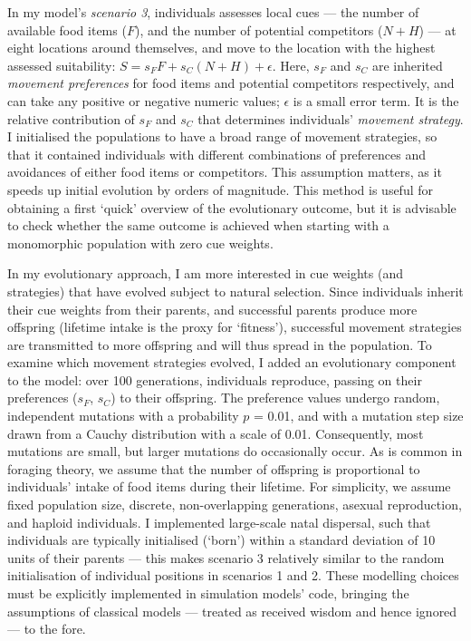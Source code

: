 \begin{interludeenv}
In my model's \textit{scenario 3}, individuals assesses local cues --- the number of available food items ($F$), and the number of potential competitors ($N + H$) --- at eight locations around themselves, and move to the location with the highest assessed suitability: $S = s_FF + s_C(N + H) + \epsilon$.
Here, $s_F$ and $s_C$ are inherited \textit{movement preferences} for food items and potential competitors respectively, and can take any positive or negative numeric values; $\epsilon$ is a small error term.
It is the relative contribution of $s_F$ and $s_C$ that determines individuals' \textit{movement strategy}.
I initialised the populations to have a broad range of movement strategies, so that it contained individuals with different combinations of preferences and avoidances of either food items or competitors.
This assumption matters, as it speeds up initial evolution by orders of magnitude. 
This method is useful for obtaining a first `quick' overview of the evolutionary outcome, but it is advisable to check whether the same outcome is achieved when starting with a monomorphic population with zero cue weights.

In my evolutionary approach, I am more interested in cue weights (and strategies) that have evolved subject to natural selection.
Since individuals inherit their cue weights from their parents, and successful parents produce more offspring (lifetime intake is the proxy for `fitness'), successful movement strategies are transmitted to more offspring and will thus spread in the population.
To examine which movement strategies evolved, I added an evolutionary component to the model: over 100 generations, individuals reproduce, passing on their preferences ($s_F$, $s_C$) to their offspring.
The preference values undergo random, independent mutations with a probability $p$ = 0.01, and with a mutation step size drawn from a Cauchy distribution with a scale of 0.01.
Consequently, most mutations are small, but larger mutations do occasionally occur.
As is common in foraging theory, we assume that the number of offspring is proportional to individuals' intake of food items during their lifetime.
For simplicity, we assume fixed population size, discrete, non-overlapping generations, asexual reproduction, and haploid individuals.
I implemented large-scale natal dispersal, such that individuals are typically initialised (`born') within a standard deviation of 10 units of their parents --- this makes scenario 3 relatively similar to the random initialisation of individual positions in scenarios 1 and 2.
These modelling choices must be explicitly implemented in simulation models' code, bringing the assumptions of classical models --- treated as received wisdom and hence ignored --- to the fore.


\end{interludeenv}
